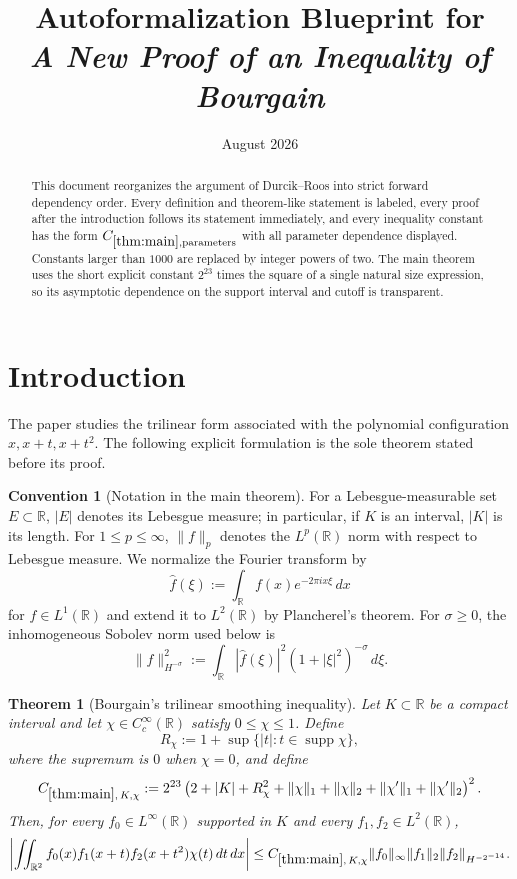 \documentclass[11pt]{article}
\title{Autoformalization Blueprint for\\
\emph{A New Proof of an Inequality of Bourgain}}
\date{August 2026}
\newtheorem{theorem}{Theorem}[section]
\theoremstyle{definition}
\newtheorem{convention}[convention]{Convention}
\theoremstyle{remark}
\newcommand{\R}{\mathbb R}
\newcommand{\supp}{\operatorname{supp}}
\newcommand{\1}{\mathbf 1}
\newcommand{\FT}[1]{\widehat{#1}}
\newcommand{\dd}{\,d}
\newcommand{\hNorm}[2]{\lVert #1\rVert_{H^{#2}}}
\newcommand{\lpNorm}[2]{\lVert #1\rVert_{#2}}
\begin{document}
\maketitle

\begin{abstract}
This document reorganizes the argument of Durcik--Roos into strict forward dependency order.  Every definition and theorem-like statement is labeled, every proof after the introduction follows its statement immediately, and every inequality constant has the form
$C_{\ref{thm:main},\text{parameters}}$ with all parameter dependence displayed.  Constants larger than $1000$ are replaced by integer powers of two.  The main theorem uses the short explicit constant
$2^{23}$ times the square of a single natural size expression, so its asymptotic dependence on the support interval and cutoff is transparent.
\end{abstract}

\tableofcontents

\section{Introduction}

The paper studies the trilinear form associated with the polynomial configuration
$x,x+t,x+t^2$.  The following explicit formulation is the sole theorem stated before its proof.

\begin{convention}[Notation in the main theorem]\label{conv:main-theorem-notation}
For a Lebesgue-measurable set $E\subset\R$, $|E|$ denotes its Lebesgue measure; in particular, if $K$ is an interval, $|K|$ is its length.  For $1\leq p\leq\infty$,
$\lpNorm fp$ denotes the $L^p(\R)$ norm with respect to Lebesgue measure.  We normalize the Fourier transform by
\[
\FT f(\xi):=\int_\R f(x)e^{-2\pi ix\xi}\dd x
\]
for $f\in L^1(\R)$ and extend it to $L^2(\R)$ by Plancherel's theorem.  For $\sigma\geq0$, the inhomogeneous Sobolev norm used below is
\[
\hNorm f{-\sigma}^2
:=\int_\R|\FT f(\xi)|^2(1+|\xi|^2)^{-\sigma}\dd\xi.
\]
\end{convention}

\begin{theorem}[Bourgain's trilinear smoothing inequality]\label{thm:main}
Let $K\subset\R$ be a compact interval and let $\chi\in C_c^\infty(\R)$ satisfy
$0\leq\chi\leq1$.  Define
\[
R_\chi:=1+\sup\{|t|:t\in\supp\chi\},
\]
where the supremum is $0$ when $\chi=0$, and define
\[
C_{\ref{thm:main},\,K,\chi}
:=
2^{23}
\left(
2+\lvert K\rvert+R_\chi^2
+\lpNorm\chi1+\lpNorm\chi2
+\lpNorm{\chi'}1+\lpNorm{\chi'}2
\right)^2.
\]
Then, for every $f_0\in L^\infty(\R)$ supported in $K$ and every
$f_1,f_2\in L^2(\R)$,
\[
\left|
\iint_{\R^2}
 f_0(x)f_1(x+t)f_2(x+t^2)\chi(t)
\dd t\dd x
\right|
\leq
C_{\ref{thm:main},\,K,\chi}
\lpNorm{f_0}\infty\lpNorm{f_1}2
\hNorm{f_2}{-2^{-14}}.
\]
\end{theorem}
\end{document}
